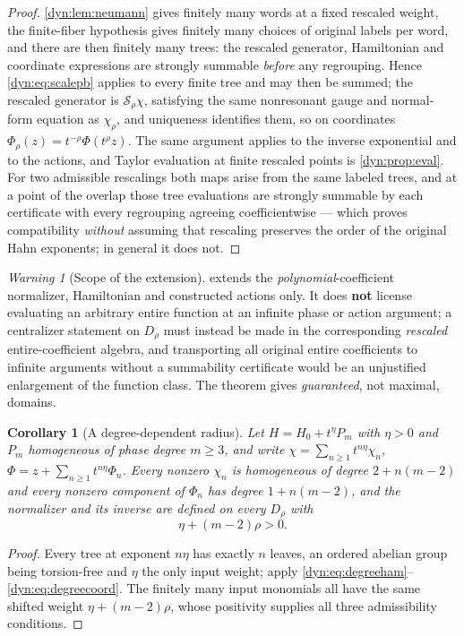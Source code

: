 \documentclass[11pt,letterpaper]{article}
\newtheorem{corollary}[corollary]{Corollary}
\theoremstyle{definition}
\theoremstyle{remark}
\newtheorem{warning}[warning]{Warning}
\numberwithin{equation}{section}
\begin{document}
\begin{proof}
\cref{dyn:lem:neumann} gives finitely many words at a fixed rescaled
weight, the finite-fiber hypothesis gives finitely many choices of original
labels per word, and there are then finitely many trees: the rescaled
generator, Hamiltonian and coordinate expressions are strongly summable
\emph{before} any regrouping. Hence \eqref{dyn:eq:scalepb} applies to every
finite tree and may then be summed; the rescaled generator is
$\mathscr S_\rho\chi$, satisfying the same nonresonant gauge and
normal-form equation as $\chi_\rho$, and uniqueness identifies them, so on
coordinates $\Phi_\rho(z)=t^{-\rho}\Phi(t^{\rho}z)$. The same argument
applies to the inverse exponential and to the actions, and Taylor
evaluation at finite rescaled points is \cref{dyn:prop:eval}. For two
admissible rescalings both maps arise from the same labeled trees, and at a
point of the overlap those tree evaluations are strongly summable by each
certificate with every regrouping agreeing coefficientwise --- which proves
compatibility \emph{without} assuming that rescaling preserves the order of
the original Hahn exponents; in general it does not.
\end{proof}

\begin{warning}[Scope of the extension]\label{dyn:warn:rescale}
 extends the \emph{polynomial}-coefficient
normalizer, Hamiltonian and constructed actions only. It does
\textbf{not} license evaluating an arbitrary entire function at an infinite
phase or action argument; a centralizer statement on $D_\rho$ must instead
be made in the corresponding \emph{rescaled} entire-coefficient algebra,
and transporting all original entire coefficients to infinite arguments
without a summability certificate would be an unjustified enlargement of
the function class. The theorem gives \emph{guaranteed}, not maximal,
domains.
\end{warning}

\begin{corollary}[A degree-dependent radius]\label{dyn:cor:homogeneous}
Let $H=H_0+t^{\eta}P_m$ with $\eta>0$ and $P_m$ homogeneous of phase degree
$m\ge3$, and write $\chi=\sum_{n\ge1}t^{n\eta}\chi_n$,
$\Phi=z+\sum_{n\ge1}t^{n\eta}\Phi_n$. Every nonzero $\chi_n$ is homogeneous
of degree $2+n(m-2)$ and every nonzero component of $\Phi_n$ has degree
$1+n(m-2)$, and the normalizer and its inverse are defined on every
$D_\rho$ with
\begin{equation}\label{dyn:eq:homogeneousdomain}
 \eta+(m-2)\rho>0 .
\end{equation}
\end{corollary}
\begin{proof}
Every tree at exponent $n\eta$ has exactly $n$ leaves, an ordered abelian
group being torsion-free and $\eta$ the only input weight; apply
\eqref{dyn:eq:degreeham}--\eqref{dyn:eq:degreecoord}. The finitely many
input monomials all have the same shifted weight $\eta+(m-2)\rho$, whose
positivity supplies all three admissibility conditions.
\end{proof}
\end{document}
